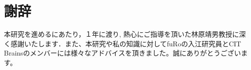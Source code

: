 \chapter*{謝辞}

本研究を進めるにあたり，１年に渡り, 熱心にご指導を頂いた林原靖男教授に深く感謝いたします．また、本研究や私の知識に対してfuRoの入江研究員とCIT Brainsのメンバーには様々なアドバイスを頂きました。誠にありがとうございます。
